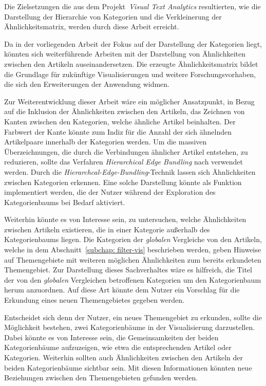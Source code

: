 Die Zielsetzungen die aus dem Projekt~\emph{Visual Text Analytics} resultierten, wie die Darstellung der Hierarchie von Kategorien und die Verkleinerung der Ähnlichkeitsmatrix, werden durch diese Arbeit erreicht.

Da in der vorliegenden Arbeit der Fokus auf der Darstellung der Kategorien liegt, könnten sich weiterführende Arbeiten mit der Darstellung von Ähnlichkeiten zwischen den Artikeln auseinandersetzen. 
Die erzeugte Ähnlichkeitsmatrix bildet die Grundlage für zukünftige Visualisierungen und weitere Forschungsvorhaben, die sich den Erweiterungen der Anwendung widmen.

Zur Weiterentwicklung dieser Arbeit wäre ein möglicher Ansatzpunkt, in Bezug auf die Inklusion der Ähnlichkeiten zwischen den Artikeln, das Zeichnen von Kanten zwischen den Kategorien, welche ähnliche Artikel beinhalten. 
Der Farbwert der Kante könnte zum Indiz für die Anzahl der sich ähnelnden Artikelpaare innerhalb der Kategorien werden.
Um die massiven Überzeichnungen, die durch die Verbindungen ähnlicher Artikel entstehen, zu reduzieren, sollte das Verfahren \emph{Hierarchical Edge Bundling} nach \cite{holten2006hierarchical} verwendet werden.
Durch die \emph{Hierarchcal-Edge-Bundling}-Technik lassen sich Ähnlichkeiten zwischen Kategorien erkennen.
Eine solche Darstellung könnte als Funktion implementiert werden, die der Nutzer während der Exploration des Kategorienbaums bei Bedarf aktiviert.

Weiterhin könnte es von Interesse sein, zu untersuchen, welche Ähnlichkeiten zwischen Artikeln existieren, die in einer Kategorie außerhalb des Kategorienbaums liegen.
Die Kategorien der \emph{globalen} Vergleiche von den Artikeln, welche in dem Abschnitt~\ref{subchap: filter-vis} beschrieben werden, geben Hinweise auf Themengebiete mit weiteren möglichen Ähnlichkeiten zum bereits erkundeten Themengebiet.
Zur Darstellung dieses Sachverhaltes wäre es hilfreich, die Titel der von den \emph{globalen} Vergleichen betroffenen Kategorien um den Kategorienbaum herum anzuordnen.
Auf diese Art könnte dem Nutzer ein Vorschlag für die Erkundung eines neuen Themengebietes gegeben werden.

Entscheidet sich denn der Nutzer, ein neues Themengebiet zu erkunden, sollte die Möglichkeit bestehen, zwei Kategorienbäume in der Visualisierung darzustellen.
Dabei könnte es von Interesse sein, die Gemeinsamkeiten der beiden Kategorienbäume aufzuzeigen, wie etwa die entsprechenden Artikel oder Kategorien.
Weiterhin sollten auch Ähnlichkeiten zwischen den Artikeln der beiden Kategorienbäume sichtbar sein.
Mit diesen Informationen könnten neue Beziehungen zwischen den Themengebieten gefunden werden.

